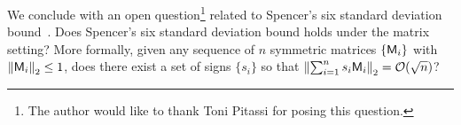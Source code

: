 %
We conclude with an open question\footnote{The author would like to thank Toni Pitassi for posing this question.} related to Spencer's six standard deviation bound~\cite{sixDeviation:Spencer}. Does Spencer's six standard deviation bound holds under the matrix setting? More formally, given any sequence of $n$ symmetric matrices $\{{\mathsf{M} }_i\}$ with $\left\| {\mathsf{M} }_i\right\|_2\leq 1$, does there exist a set of signs $\{s_i\}$ so that $\left\| \sum_{i=1}^{n} s_i {\mathsf{M} }_i\right\|_2 = \mathcal{O}(\sqrt{n})$?
%
%
%
%
%
%
%
%
